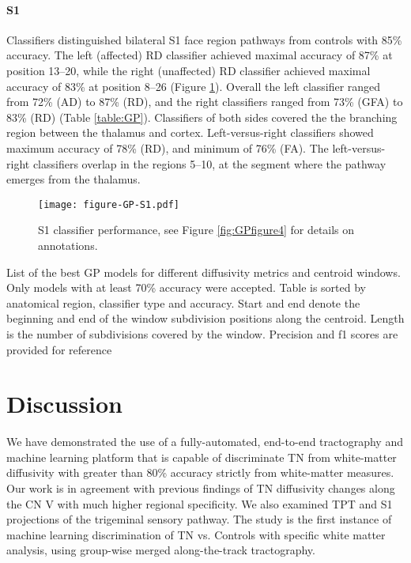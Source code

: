 \paragraph{S1}
Classifiers distinguished bilateral S1 face region pathways from controls with 85\% accuracy. The left (affected) RD classifier achieved maximal accuracy of 87\% at position 13--20, while the right (unaffected) RD classifier achieved maximal accuracy of 83\% at position 8--26 (Figure \ref{fig:GPfigure5}). Overall the left classifier ranged from 72\% (AD) to 87\% (RD), and the right classifiers ranged from 73\% (GFA) to 83\% (RD) (Table \ref{table:GP}). Classifiers of both sides covered the the branching region between the thalamus and cortex. Left-versus-right classifiers showed maximum accuracy of 78\% (RD), and minimum of 76\% (FA). The left-versus-right classifiers overlap in the regions 5--10, at the segment where the pathway emerges from the thalamus.

\begin{figure}[ht]
\centering
\texttt{[image: figure-GP-S1.pdf]}
\caption{S1 classifier performance, see Figure \ref{fig:GPfigure4} for details on annotations.}
\label{fig:GPfigure5}
\end{figure}

\begin{table}[ht]
\centering
\small
{}
\caption{List of the best GP models for different diffusivity metrics and centroid windows. Only models with at least 70\% accuracy were accepted. Table is sorted by anatomical region, classifier type and accuracy. Start and end denote the beginning and end of the window subdivision positions along the centroid. Length is the number of subdivisions covered by the window. Precision and f1 scores are provided for reference}
\label{table:GP}
\end{table}

\section{Discussion}
We have demonstrated the use of a fully-automated, end-to-end tractography and machine learning platform that is capable of discriminate TN from white-matter diffusivity with greater than 80\% accuracy strictly from white-matter measures. Our work is in agreement with previous findings of TN diffusivity changes along the CN V with much higher regional specificity. We also examined TPT and S1 projections of the trigeminal sensory pathway. The study is the first instance of machine learning discrimination of TN vs. Controls with specific white matter analysis, using group-wise merged along-the-track tractography. 

